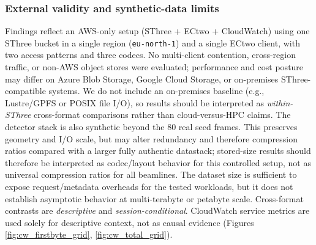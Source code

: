 \documentclass[nomenclature, english, bibtex]{kththesis}
\numberwithin{listing}{chapter}
\begin{document}
\subsubsection{External validity and synthetic-data limits}
Findings reflect an \gls{AWS}-only setup (\gls{SThree} + \gls{ECtwo} + CloudWatch) using one \gls{SThree} bucket in a single region (\texttt{eu-north-1}) and a single \gls{ECtwo} client, with two access patterns and three codecs. No multi-client contention, cross-region traffic, or non-\gls{AWS} object stores were evaluated; performance and cost posture may differ on Azure Blob Storage, Google Cloud Storage, or on-premises \gls{SThree}-compatible systems. We do not include an on-premises baseline (e.g., Lustre/\gls{GPFS} or \gls{POSIX} file I/O), so results should be interpreted as \emph{within-\gls{SThree}} cross-format comparisons rather than cloud-versus-\gls{HPC} claims. The detector stack is also synthetic beyond the 80 real seed frames. This preserves geometry and I/O scale, but may alter redundancy and therefore compression ratios compared with a larger fully authentic datastack; stored-size results should therefore be interpreted as codec/layout behavior for this controlled setup, not as universal compression ratios for all beamlines. The dataset size is sufficient to expose request/metadata overheads for the tested workloads, but it does not establish asymptotic behavior at multi-terabyte or petabyte scale. Cross-format contrasts are \emph{descriptive} and \emph{session-conditional}. CloudWatch service metrics are used solely for descriptive context, not as causal evidence (Figures \ref{fig:cw_firstbyte_grid}, \ref{fig:cw_total_grid}).
\end{document}
